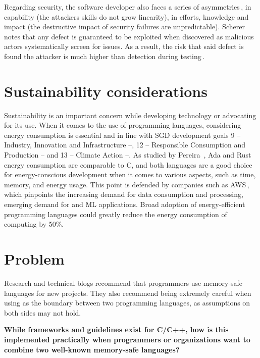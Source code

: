 \documentclass[nomenclature, english, bibtex]{kththesis}
\begin{document}
Regarding security, the software developer also faces a series of asymmetries\,\cite{chapman_adacore_2018}, in capability (the attackers skills do not grow linearity), in efforts, knowledge and impact (the destructive impact of security failures are unpredictable). Scherer notes that any defect is guaranteed to be exploited when discovered as malicious actors systematically screen for issues. As a result, the risk that said defect is found the attacker is much higher than detection during testing\,\cite{scherer_engineering_2021}.


\section{Sustainability considerations}

Sustainability is an important concern while developing technology or advocating for its use. When it comes to the use of programming languages, considering energy consumption is essential and in line with SGD development goals 9 -- Industry, Innovation and Infrastructure --, 12 -- Responsible Consumption and Production -- and 13 -- Climate Action --\cite{noauthor_envision2030_nodate}. As studied by Pereira \etal\,\cite{pereira_energy_2017}, Ada and Rust energy consumption are comparable to C, and both languages are a good choice for energy-conscious development when it comes to various aspects, such as time, memory, and energy usage. This point is defended by companies such as AWS\,\cite{miller_sustainability_2022}, which pinpoints the increasing demand for data consumption and processing, emerging demand for  and ML applications. Broad adoption of energy-efficient programming languages could greatly reduce the energy consumption of computing by 50\%\cite{miller_sustainability_2022}.

\section{Problem}
\label{sec:problem}

Research and technical blogs recommend that programmers use memory-safe languages for new projects. They also recommend being extremely careful when using  as the boundary between two programming languages, as assumptions on both sides may not hold. 

\textbf{While frameworks and guidelines exist for C/C++, how is this implemented practically when programmers or organizations want to combine two well-known memory-safe languages?}
\end{document}
